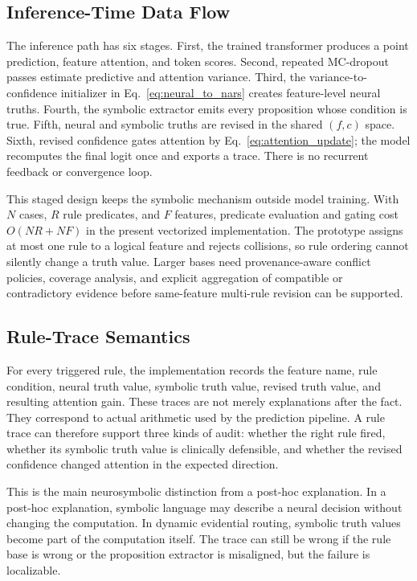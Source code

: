 \documentclass[final]{nesy2026}
\begin{document}
\subsection{Inference-Time Data Flow}

The inference path has six stages. First, the trained transformer produces a point prediction, feature attention, and token scores. Second, repeated MC-dropout passes estimate predictive and attention variance. Third, the variance-to-confidence initializer in Eq.~\eqref{eq:neural_to_nars} creates feature-level neural truths. Fourth, the symbolic extractor emits every proposition whose condition is true. Fifth, neural and symbolic truths are revised in the shared $(f,c)$ space. Sixth, revised confidence gates attention by Eq.~\eqref{eq:attention_update}; the model recomputes the final logit once and exports a trace. There is no recurrent feedback or convergence loop.

This staged design keeps the symbolic mechanism outside model training. With $N$ cases, $R$ rule predicates, and $F$ features, predicate evaluation and gating cost $O(NR+NF)$ in the present vectorized implementation. The prototype assigns at most one rule to a logical feature and rejects collisions, so rule ordering cannot silently change a truth value. Larger bases need provenance-aware conflict policies, coverage analysis, and explicit aggregation of compatible or contradictory evidence before same-feature multi-rule revision can be supported.

\subsection{Rule-Trace Semantics}

For every triggered rule, the implementation records the feature name, rule condition, neural truth value, symbolic truth value, revised truth value, and resulting attention gain. These traces are not merely explanations after the fact. They correspond to actual arithmetic used by the prediction pipeline. A rule trace can therefore support three kinds of audit: whether the right rule fired, whether its symbolic truth value is clinically defensible, and whether the revised confidence changed attention in the expected direction.

This is the main neurosymbolic distinction from a post-hoc explanation. In a post-hoc explanation, symbolic language may describe a neural decision without changing the computation. In dynamic evidential routing, symbolic truth values become part of the computation itself. The trace can still be wrong if the rule base is wrong or the proposition extractor is misaligned, but the failure is localizable.
\end{document}
